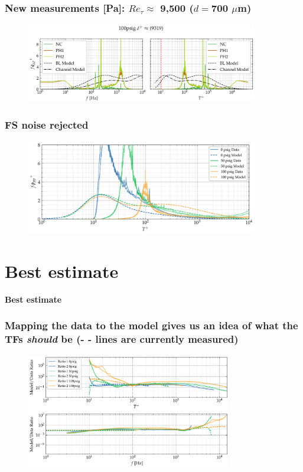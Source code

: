 \documentclass[aspectratio=169,9pt]{beamer}
\begin{document}
\begin{frame}
  \frametitle{New measurements [Pa]: $Re_\tau \approx$ 9,500 ($d=$700 $\mu$m)}
  \begin{figure}
      \centering
      \includegraphics[width=0.9\textwidth]{final/100psig.png}
  \end{figure}
\end{frame}

\begin{frame}
  \frametitle{FS noise rejected}
  \begin{figure}
      \centering
      \includegraphics[width=0.9\textwidth]{final/spectra_comparison.png}
  \end{figure}
\end{frame}



\section{Best estimate}
\begin{frame}
  \centering
  \vfill
  {\Huge\bfseries \textcolor{cardinalred}{Best estimate}}
  \vfill
\end{frame}

\begin{frame}
  \frametitle{Mapping the data to the model gives us an idea of what the TFs \emph{should} be (- - lines are currently measured)}
  \begin{figure}
      \centering
      \includegraphics[width=0.8\textwidth]{final/required_transfer_functions.png}
  \end{figure}
\end{frame}
\end{document}
